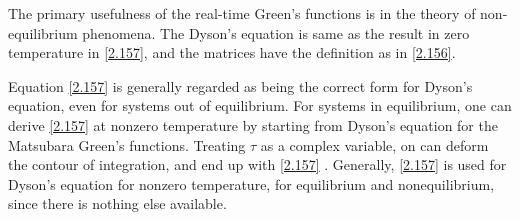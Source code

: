 The primary usefulness of the real-time Green's functions is in the theory of non-equilibrium phenomena.
The Dyson's equation is same as the result in zero temperature in \eqref{2.157}, and the matrices have the definition as in \eqref{2.156}.

Equation \eqref{2.157} is generally regarded as being the correct form for Dyson's equation, even for systems out of equilibrium.
For systems in equilibrium, one can derive \eqref{2.157} at nonzero temperature by starting from Dyson's equation for the Matsubara Green's functions.
Treating $\tau$ as a complex variable, on can deform the contour of integration, and end up with \eqref{2.157} \cite{Langreth1976}.
Generally, \eqref{2.157} is used for Dyson's equation for nonzero temperature, for equilibrium and nonequilibrium, since there is nothing else available.

